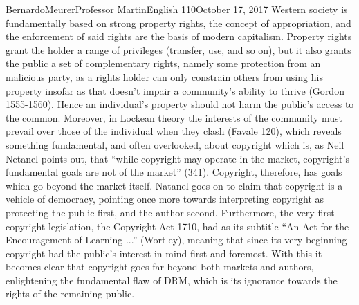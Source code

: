 \documentclass[12pt,letterpaper]{article}
\begin{document}
\begin{mla}{Bernardo}{Meurer}{Professor Martin}{English 110}{October 17, 2017}
        Western society is fundamentally based on strong property rights, the concept of appropriation, and the enforcement of said rights are the basis of modern capitalism. Property rights grant the holder a range of privileges (transfer, use, and so on), but it also grants the public a set of complementary rights, namely some protection from an malicious party, as a rights holder can only constrain others from using his property insofar as that doesn't impair a community's ability to thrive (Gordon 1555-1560). Hence an individual's property should not harm the public's access to the common. Moreover, in Lockean theory the interests of the community must prevail over those of the individual when they clash (Favale 120), which reveals something fundamental, and often overlooked, about copyright which is, as Neil Netanel points out, that ``while copyright may operate in the market, copyright's fundamental goals are not of the market'' (341). Copyright, therefore, has goals which go beyond the market itself. Natanel goes on to claim that copyright is a vehicle of democracy, pointing once more towards interpreting copyright as protecting the public first, and the author second. Furthermore, the very first copyright legislation, the Copyright Act 1710, had as its subtitle ``An Act for the Encouragement of Learning ...'' (Wortley), meaning that since its very beginning copyright had the public's interest in mind first and foremost. With this it becomes clear that copyright goes far beyond both markets and authors, enlightening the fundamental flaw of DRM, which is its ignorance towards the rights of the remaining public.


\end{mla}
\end{document}
